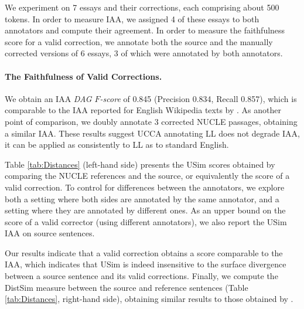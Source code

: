 \documentclass[a4paper, 11pt]{article}
\begin{document}
We experiment on 7 essays and their corrections, each comprising about 500 tokens.
In order to measure IAA, we assigned 4 of these essays to both annotators
and compute their agreement.
In order to measure the faithfulness score for a valid correction,
we annotate both the source
and the manually corrected versions of 6 essays,
3 of which were annotated by both annotators.

\vspace{-.2cm}
\paragraph{The Faithfulness of Valid Corrections.}
We obtain an IAA {\it DAG $F$-score} of 0.845
(Precision 0.834, Recall 0.857), which
is comparable to the IAA reported for English Wikipedia texts by \cite{abend2013universal}.
As another point of comparison, we doubly annotate 3 corrected
NUCLE \cite{dahlmeier2013building} passages, obtaining a similar IAA.
These results suggest UCCA annotating LL does not degrade IAA, 
it can be applied as consistently to LL as to standard English.

Table \ref{tab:Distances} (left-hand side) presents the {\sc USim} scores obtained by comparing 
the NUCLE references and the source, or equivalently the score of a valid correction.
To control for differences between the annotators, we explore both
a setting where both sides are annotated by the same annotator,
and a setting where they are annotated by different ones.
As an upper bound on the score of a valid corrector (using different annotators),
we also report the {\sc USim} IAA on source sentences. 

Our results indicate that a valid correction obtains a score comparable
to the IAA, which indicates that {\sc USim} is indeed
insensitive to the surface divergence between a source sentence and its valid corrections.
Finally, we compute the {\sc DistSim} measure
between the source and reference sentences (Table \ref{tab:Distances}, right-hand side),
obtaining similar results to those obtained by .
\end{document}
